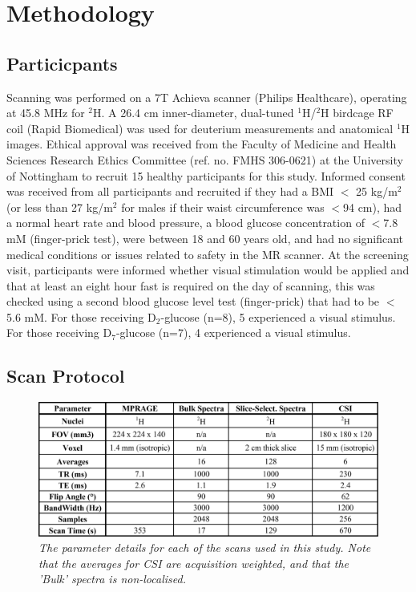 \documentclass[class=article, crop=false]{standalone}
\begin{document}
\section{Methodology}

\subsection{Particicpants}

Scanning was performed on a 7T Achieva scanner (Philips Healthcare), operating at 45.8 MHz for $^2$H. A 26.4 cm inner-diameter, dual-tuned $^1$H/$^2$H birdcage RF coil (Rapid Biomedical) was used for deuterium measurements and anatomical $^1$H images. Ethical approval was received from the Faculty of Medicine and Health Sciences Research Ethics Committee (ref. no. FMHS 306-0621) at the University of Nottingham to recruit 15 healthy participants for this study. Informed consent was received from all participants and recruited if they had a BMI $<$ 25 kg/m$^2$ (or less than 27 kg/m$^2$ for males if their waist circumference was $<$94 cm), had a normal heart rate and blood pressure, a blood glucose concentration of $<$7.8 mM (finger-prick test), were between 18 and 60 years old, and had no significant medical conditions or issues related to safety in the MR scanner. At the screening visit, participants were informed whether visual stimulation would be applied and that at least an eight hour fast is required on the day of scanning, this was checked using a second blood glucose level test (finger-prick) that had to be $<$5.6 mM. For those receiving D$_2$-glucose (n=8), 5 experienced a visual stimulus. For those receiving D$_7$-glucose (n=7), 4 experienced a visual stimulus.

\subsection{Scan Protocol}

\begin{figure}
    \centering
    \includegraphics[width = 1\textwidth]{Figures/Glucose/Scan_Details.png}
    \caption{\textit{The parameter details for each of the scans used in this study. Note that the averages for CSI are acquisition weighted, and that the 'Bulk' spectra is non-localised.}}
    \label{fig:Glu:Scan_Details}
\end{figure}
\end{document}
